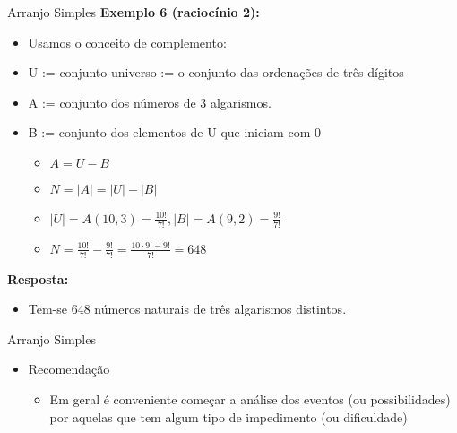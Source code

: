 \documentclass[aspectratio=169]{beamer}
\begin{document}
\begin{frame}{Arranjo Simples}
    \textbf{Exemplo 6 (raciocínio 2):}
    \vspace{2mm}

    \begin{itemize}
        \item[] Usamos o conceito de complemento:
        \item U := conjunto universo := o conjunto das ordenações de três dígitos
        \item A := conjunto dos números de 3 algarismos.
        \item B := conjunto dos elementos de U que iniciam com 0 
        \begin{itemize}
            \item $A = U - B$
            \item $N = |A| = |U| - |B|$
        \end{itemize}
        \vspace{2mm}
        \pause 
        \begin{itemize}
            \item $|U| = A(10,3) = \frac{10!}{7!}, |B| = A(9,2) = \frac{9!}{7!}$
            \item $N = \frac{10!}{7!} - \frac{9!}{7!} = \frac{10 \cdot 9! - 9!}{7!} = 648$
        \end{itemize}
    \end{itemize}

    \vspace{2mm}
    \pause
    \textbf{Resposta:}
    
    \begin{itemize}
        \item Tem-se 648 números naturais de três algarismos distintos.
    \end{itemize}

    
\end{frame}


\begin{frame}{Arranjo Simples}
    

    \begin{itemize}
        \item Recomendação
        \vspace{4mm}
        \begin{itemize}
            \item Em geral é conveniente começar a análise dos eventos (ou possibilidades) por aquelas que tem algum tipo de impedimento (ou dificuldade)
        \end{itemize}
    \end{itemize}

\end{frame}
\end{document}
